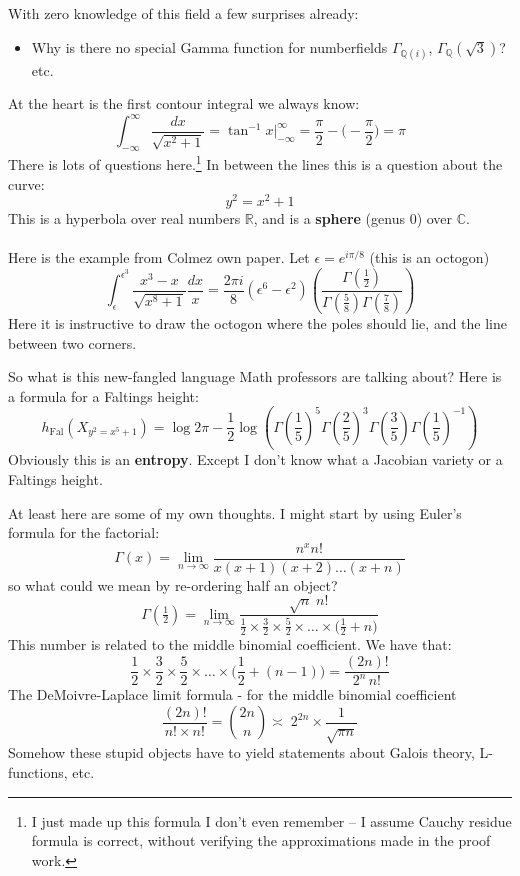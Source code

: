 \documentclass[12pt]{article}
\begin{document}
\newpage

\noindent With zero knowledge of this field a few surprises already:
\begin{itemize}
	\item Why is there no special Gamma function for numberfields $\Gamma_{\mathbb{Q}(i)}$, $\Gamma_\mathbb{Q}(\sqrt{3})$? etc.
\end{itemize}
At the heart is the first contour integral we always know:
$$  \int_{-\infty}^\infty \frac{dx}{\sqrt{x^2 + 1}} = \tan^{-1} x \bigg|^\infty_{-\infty} = \frac{\pi}{2} - \bigg(-\frac{\pi}{2} \bigg) = \pi $$
There is lots of questions here.\footnote{ I just made up this formula I don't even remember -- I assume Cauchy residue formula is correct, without verifying the approximations made in the proof work.}  In between the lines this is a question about the curve:
$$ y^2 = x^2 + 1 $$
This is a hyperbola over real numbers $\mathbb{R}$, and is a \textbf{sphere} (genus 0) over $\mathbb{C}$. \\ \\ 
Here is the example from Colmez own paper.  Let $\epsilon = e^{i\pi/8}$ (this is an {\color{green!80!white}octogon})
$$ \int_\epsilon^{\epsilon^3} \frac{x^3 - x}{\sqrt{x^8 + 1}} \frac{dx}{x} = \frac{2\pi i}{8} (\epsilon^6 - \epsilon^2) \left( \frac{\Gamma(\frac{1}{2})}{
\Gamma(\frac{5}{8})\Gamma(\frac{7}{8})} \right)$$
Here it is instructive to draw the octogon where the poles should lie, and the line between two corners. 
\newpage

\noindent So what is this new-fangled language Math professors are talking about?  Here is a formula for a Faltings height:
$$ h_\text{Fal}( X_{y^2 = x^5 + 1})
= \log 2\pi - \frac{1}{2} \log \left(
\Gamma(\frac{1}{5})^5
\Gamma(\frac{2}{5})^3
\Gamma(\frac{3}{5})
\Gamma(\frac{1}{5})^{-1} \right) $$
Obviously this is an \textbf{entropy}.  Except I don't know what a Jacobian variety or a Faltings height.

\newpage

\noindent At least here are some of my own thoughts.  I might start by using Euler's formula for the factorial:
$$ \Gamma(x) = \lim_{n \to \infty} \frac{n^x n!}{x(x+1)(x+2)\dots (x+n)} $$
so what could we mean by re-ordering half an object?
$$\Gamma(\tfrac{1}{2}) = \lim_{n \to \infty}
\frac{ \sqrt{n} \;n!}{ \frac{1}{2} \times \frac{3}{2} \times \frac{5}{2} \times \dots \times \big(\frac{1}{2}+n\big)} $$
This number is related to the middle binomial coefficient.  We have that:
$$
\frac{1}{2} \times \frac{3}{2} \times \frac{5}{2} \times \dots \times \bigg( \frac{1}{2}+(n-1) \bigg)
= \frac{(2n)!}{2^n \, n!}
 $$
The DeMoivre-Laplace limit formula - for the middle binomial coefficient 
$$ \frac{(2n)!}{n! \times n!} =  \binom{2n}{n} \asymp
\; 2^{2n} \times \frac{1}{ \sqrt{\pi n}} $$
Somehow these stupid objects have to yield statements about Galois theory, L-functions, etc.
\end{document}
